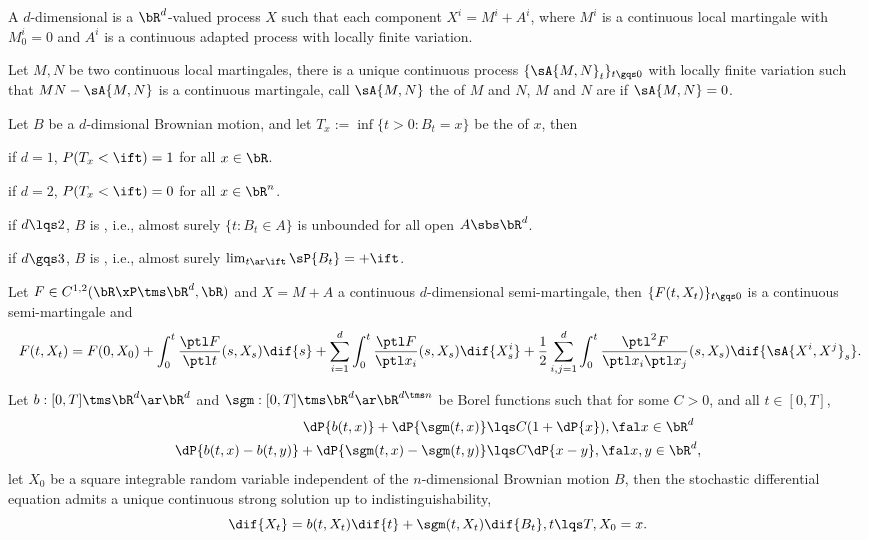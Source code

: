 \documentclass[article, a4paper, twoside]{universal}
\begin{document}
\begin{dfn}[1.3]
    A $d$-dimensional  is a $\bR^{d}$-valued process $X$ such that each component $X^{i}=M^{i}+A^{i}$, where $M^{i}$ is a continuous local martingale with $M_{0}^{i}=0$ and $A^{i}$ is a continuous adapted process with locally finite variation.
\end{dfn}

\begin{dfn}[1.3.1.2]
    Let $M,N$ be two continuous local martingales, there is a unique continuous process $\{\sA{M,N}_{t}\}_{t\gqs0}$ with locally finite variation such that $MN-\sA{M,N}$ is a continuous martingale, call $\sA{M,N}$ the  of $M$ and $N$, $M$ and $N$ are  if $\sA{M,N}=0$.
\end{dfn}

\begin{thm}[1.4.2.1]
    Let $B$ be a $d$-dimsional Brownian motion, and let $T_{x}:=\inf\{t>0:B_{t}=x\}$ be the  of $x$, then
    \begin{itm}
        \item if $d=1$, $P(T_{x}<\ift)=1$ for all $x\in\bR$.
        \item if $d=2$, $P(T_{x}<\ift)=0$ for all $x\in\bR^{n}$.
        \item if $d\lqs2$, $B$ is , i.e., almost surely $\{t:B_{t}\in A\}$ is unbounded for all open $A\sbs\bR^{d}$.
        \item if $d\gqs3$, $B$ is , i.e., almost surely $\lim_{t\ar\ift}\sP{B_{t}}=+\ift$.
    \end{itm}
\end{thm}

\begin{thm}[1.5.3.1, It{\^o}]
    Let $F\in C^{1,2}(\bR\xP\tms\bR^{d},\bR)$ and $X=M+A$ a continuous $d$-dimensional semi-martingale, then $\{F(t,X_{t})\}_{t\gqs0}$ is a continuous semi-martingale and
    \[\
      F(t,X_{t})=F(0,X_{0})+\int_{0}^{t}\frac{\ptl F}{\ptl t}(s,X_{s})\dif{s}+\sum_{i=1}^{d}\int_{0}^{t}\frac{\ptl F}{\ptl x_{i}}(s,X_{s})\dif{X_{s}^{i}}+\frac{1}{2}\sum_{i,j=1}^{d}\int_{0}^{t}\frac{\ptl^{2}F}{\ptl x_{i}\ptl x_{j}}(s,X_{s})\dif{\sA{X^{i},X^{j}}_{s}}.
    \]
\end{thm}


\begin{thm}[1.5.4.6]
    Let $b:[0,T]\tms\bR^{d}\ar\bR^{d}$ and $\sgm:[0,T]\tms\bR^{d}\ar\bR^{d\tms n}$ be Borel functions such that for some $C>0$, and all $t\in [0,T]$,
    \begin{align*}
      \dP{b(t,x)}+\dP{\sgm(t,x)}&\lqs C(1+\dP{x}), \fal x\in\bR^{d}\\
      \dP{b(t,x)-b(t,y)}+\dP{\sgm(t,x)-\sgm(t,y)}&\lqs C\dP{x-y}, \fal x,y\in\bR^{d},
    \end{align*}
    let $X_{0}$ be a square integrable random variable independent of the $n$-dimensional Brownian motion $B$, then the stochastic differential equation admits a unique continuous strong solution up to indistinguishability,
    \[
        \dif{X_{t}}=b(t,X_{t})\dif{t}+\sgm(t,X_{t})\dif{B_{t}}, t\lqs T, X_{0}=x.
    \]
\end{thm}
\end{document}

